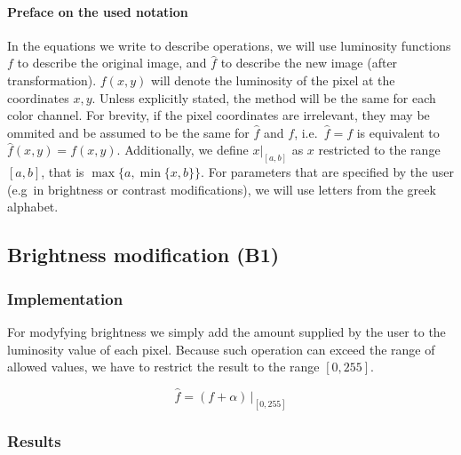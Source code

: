 \documentclass[12pt]{article}
\theoremstyle{definition}
\begin{document}
\paragraph*{Preface on the used notation}
In the equations we write to describe operations, we will use luminosity functions $f$ to describe the original image, and $\hat{f}$ to describe the new image (after transformation).
$f(x,y)$ will denote the luminosity of the pixel at the coordinates $x,y$. Unless explicitly stated, the method will be the same for each color channel.
For brevity, if the pixel coordinates are irrelevant, they may be ommited and be assumed to be the same for $\hat{f}$ and $f$, i.e.\ $\hat{f}=f$ is equivalent to $\hat{f}(x,y) = f(x,y)$.
Additionally, we define $x|_{[a,b]}$ as $x$ restricted to the range $[a,b]$, that is $\max\{a, \min\{x,b\}\}$.
For parameters that are specified by the user (e.g\ in brightness or contrast modifications), we will use letters from the greek alphabet.

\vspace{5em}
\subsection{Brightness modification (B1)}

\subsubsection{Implementation}

For modyfying brightness we simply add the amount supplied by the user to the luminosity value of each pixel.
Because such operation can exceed the range of allowed values, we have to restrict the result to the range $[0,255]$.

\begin{equation}
    \hat{f} = (f + \alpha) \, \Big|_{[0,255]}
\end{equation}

\subsubsection{Results}
\end{document}
